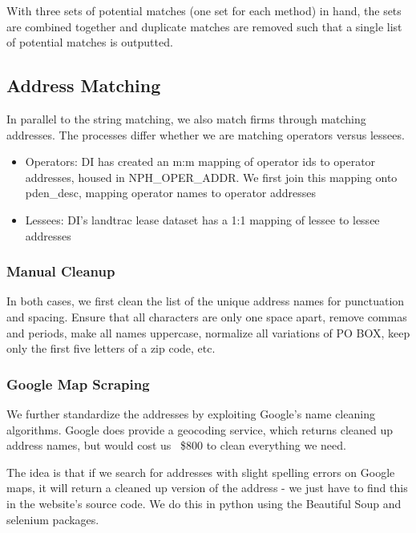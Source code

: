 \documentclass{article}
\begin{document}
With three sets of potential matches (one set for each method) in hand, the sets are combined together and duplicate matches are removed such that a single list of potential matches is outputted.

\subsection{Address Matching}

In parallel to the string matching, we also match firms through matching addresses. The processes differ whether we are matching operators versus lessees.
\begin{itemize}
    \item Operators: DI has created an m:m mapping of operator ids to operator addresses, housed in NPH\_OPER\_ADDR. We first join this mapping onto pden\_desc, mapping operator names to operator addresses
    \item Lessees: DI's landtrac lease dataset has a 1:1 mapping of lessee to lessee addresses
\end{itemize}

\subsubsection{Manual Cleanup}
In both cases, we first clean the list of the unique address names for punctuation and spacing. Ensure that all characters are only one space apart, remove commas and periods, make all names uppercase, normalize all variations of PO BOX, keep only the first five letters of a zip code, etc.

\iffalse
\subsubsection{Google Map Scraping}
We further standardize the addresses by exploiting Google's name cleaning algorithms. Google does provide a geocoding service, which returns cleaned up address names, but would cost us ~\$800 to clean everything we need. 

The idea is that if we search for addresses with slight spelling errors on Google maps, it will return a cleaned up version of the address - we just have to find this in the website's source code. We do this in python using the Beautiful Soup and selenium packages. 
\end{document}
